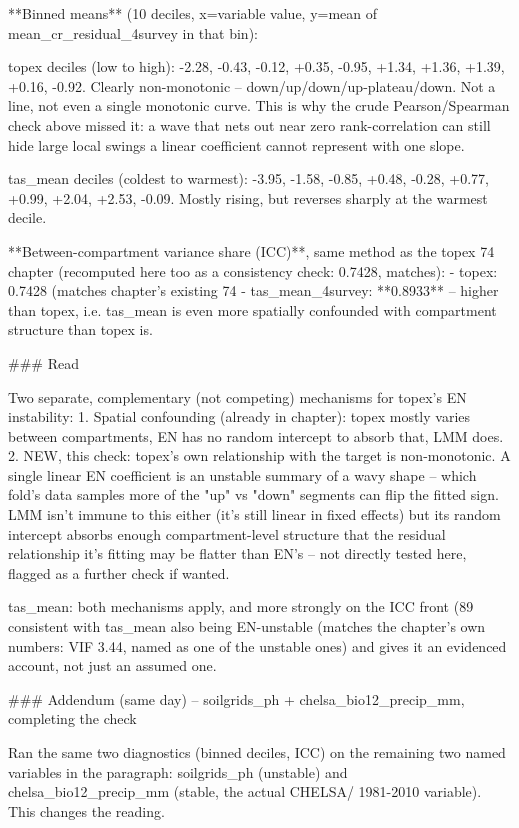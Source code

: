 **Binned means** (10 deciles, x=variable value, y=mean of mean_cr_residual_4survey in that bin):

topex deciles (low to high): -2.28, -0.43, -0.12, +0.35, -0.95, +1.34, +1.36, +1.39, +0.16, -0.92.
Clearly non-monotonic -- down/up/down/up-plateau/down. Not a line, not even a single monotonic
curve. This is why the crude Pearson/Spearman check above missed it: a wave that nets out near
zero rank-correlation can still hide large local swings a linear coefficient cannot represent
with one slope.

tas_mean deciles (coldest to warmest): -3.95, -1.58, -0.85, +0.48, -0.28, +0.77, +0.99, +2.04,
+2.53, -0.09. Mostly rising, but reverses sharply at the warmest decile.

**Between-compartment variance share (ICC)**, same method as the topex 74%
chapter (recomputed here too as a consistency check: 0.7428, matches):
- topex: 0.7428 (matches chapter's existing 74%
- tas_mean_4survey: **0.8933** -- higher than topex, i.e. tas_mean is even more spatially
  confounded with compartment structure than topex is.

### Read

Two separate, complementary (not competing) mechanisms for topex's EN instability:
1. Spatial confounding (already in chapter): topex mostly varies between compartments, EN has no
   random intercept to absorb that, LMM does.
2. NEW, this check: topex's own relationship with the target is non-monotonic. A single linear EN
   coefficient is an unstable summary of a wavy shape -- which fold's data samples more of the
   "up" vs "down" segments can flip the fitted sign. LMM isn't immune to this either (it's still
   linear in fixed effects) but its random intercept absorbs enough compartment-level structure
   that the residual relationship it's fitting may be flatter than EN's -- not directly tested
   here, flagged as a further check if wanted.

tas_mean: both mechanisms apply, and more strongly on the ICC front (89%
consistent with tas_mean also being EN-unstable (matches the chapter's own numbers: VIF 3.44,
named as one of the unstable ones) and gives it an evidenced account, not just an assumed one.

### Addendum (same day) -- soilgrids_ph + chelsa_bio12_precip_mm, completing the check

Ran the same two diagnostics (binned deciles, ICC) on the remaining two named variables in the
paragraph: soilgrids_ph (unstable) and chelsa_bio12_precip_mm (stable, the actual CHELSA/
1981-2010 variable). This changes the reading.

